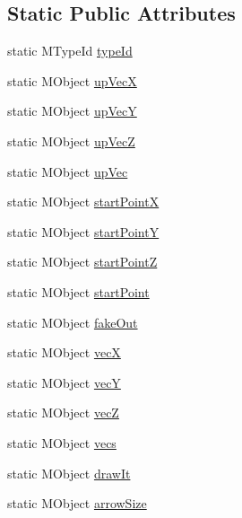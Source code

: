 \subsection*{Static Public Attributes}
\begin{DoxyCompactItemize}
\item 
static M\-Type\-Id \hyperlink{class_m_g__vector_g_l_acca8150a834863494fd5f1b00680289e}{type\-Id}
\item 
static M\-Object \hyperlink{class_m_g__vector_g_l_a70c7ff57dc885d2fed64e61fa6dce7c4}{up\-Vec\-X}
\item 
static M\-Object \hyperlink{class_m_g__vector_g_l_abccaa6f4f93a98f68c0aec200763f6c5}{up\-Vec\-Y}
\item 
static M\-Object \hyperlink{class_m_g__vector_g_l_aa5348daa3385f54237190545cdf21009}{up\-Vec\-Z}
\item 
static M\-Object \hyperlink{class_m_g__vector_g_l_a9fa637bb5b24532d768f5b8912c3f92e}{up\-Vec}
\item 
static M\-Object \hyperlink{class_m_g__vector_g_l_ae7c3a0612e7db7b56e6e96c0179aefc6}{start\-Point\-X}
\item 
static M\-Object \hyperlink{class_m_g__vector_g_l_af1d06d50730959946fc5db507eefa3aa}{start\-Point\-Y}
\item 
static M\-Object \hyperlink{class_m_g__vector_g_l_a00e63c6a4cf63e7c71cc22e094578470}{start\-Point\-Z}
\item 
static M\-Object \hyperlink{class_m_g__vector_g_l_ac0ca586f36cae208f5fb0655d5f5a534}{start\-Point}
\item 
static M\-Object \hyperlink{class_m_g__vector_g_l_ac9e29eb01772ab64b67fe0ac130dceef}{fake\-Out}
\item 
static M\-Object \hyperlink{class_m_g__vector_g_l_a6eeaca2cfdf01a1cde7727a7d02e9fb8}{vec\-X}
\item 
static M\-Object \hyperlink{class_m_g__vector_g_l_ab83a515ef8a0389db4fffdd27deb0a15}{vec\-Y}
\item 
static M\-Object \hyperlink{class_m_g__vector_g_l_a793496afb749c8d022fb487e7cb7ef50}{vec\-Z}
\item 
static M\-Object \hyperlink{class_m_g__vector_g_l_a7e8fcd12774565e52cfc9a088426fda5}{vecs}
\item 
static M\-Object \hyperlink{class_m_g__vector_g_l_a5d59b4c3dfc50250558acfabca45a260}{draw\-It}
\item 
static M\-Object \hyperlink{class_m_g__vector_g_l_a51ce57b6d4cac43cf6b9fbdf377691c4}{arrow\-Size}
\item 

\end{DoxyCompactItemize}

